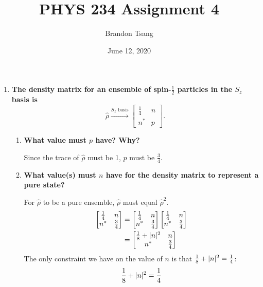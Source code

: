 \documentclass[11pt]{article}
\title{PHYS 234 Assignment 4}
\author{Brandon Tsang}
\date{June 12, 2020}
\DeclarePairedDelimiter\abs{\lvert}{\rvert}
\begin{document}
    \maketitle
    \begin{enumerate}[label=\textbf{\arabic*.}, start=3]
        \item{
            \textbf{\boldmath The density matrix for an ensemble of spin-\(\frac 1 2\) particles in the \(S_z\) basis is \[\hat\rho\xrightarrow[]{S_z\text{ basis}}\begin{bmatrix}\frac 1 4 & n \\ n^* & p\end{bmatrix}.\]}
            \begin{enumerate}[label=\textbf{(\alph*)}]
                \item{
                    \textbf{\boldmath What value must \(p\) have? Why?}
                    \par
                    Since the trace of \(\hat\rho\) must be 1, \(p\) must be \(\frac 3 4\).
                }
                \item{
                    \textbf{\boldmath What value(s) must \(n\) have for the density matrix to represent a pure state?}
                    \par
                    For \(\hat\rho\) to be a pure ensemble, \(\hat\rho\) must equal \(\hat\rho^2\).
                    \begin{align*}
                        \begin{bmatrix}\frac 1 4 & n \\ n^* & \frac 3 4\end{bmatrix}&=\begin{bmatrix}\frac 1 4 & n \\ n^* & \frac 3 4\end{bmatrix}\begin{bmatrix}\frac 1 4 & n \\ n^* & \frac 3 4\end{bmatrix} \\
                        &=\begin{bmatrix}\frac 1 8+\abs{n}^2 & n \\ n^* & \frac 3 4\end{bmatrix}
                    \end{align*}
                    The only constraint we have on the value of \(n\) is that \(\frac 1 8 +\abs{n}^2=\frac 1 4\):
                    \begin{align*}
                        \frac 1 8 +\abs{n}^2=\frac 1 4 \\

\end{align*}}
\end{enumerate}}
\end{enumerate}
\end{document}
